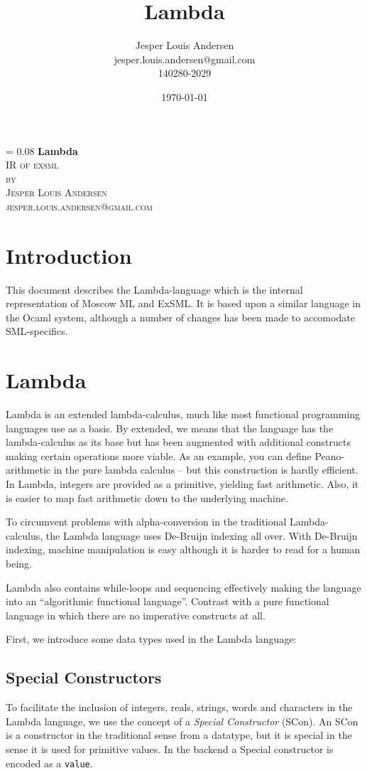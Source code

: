 \documentclass[a4paper, oneside, 10pt, draft]{memoir}
\author{Jesper Louis
  Andersen\\jesper.louis.andersen@gmail.com\\140280-2029}
\title{Lambda}
\date{\today}
\makeatletter
\newlength{\drop}
\newcommand*{\titleM}{\begingroup%
  \drop = 0.08\textheight
  \centering
  {\Huge\bfseries Lambda}\\[\baselineskip]
  {\scshape IR of exsml}\\[\baselineskip]
  {\scshape by}\\[\baselineskip]
  {\large\scshape Jesper Louis Andersen\\jesper.louis.andersen@gmail.com}\par
  \endgroup}
\makeatother
\begin{document}
\newcommand{\janusz}{$\mathrm{JANUS}_0$}
\newcommand{\januso}{$\mathrm{JANUS}_1$}
\newcommand{\lift}[1]{\lfloor #1 \rfloor}
\newcommand{\NN}{\mathbb{N}}
\newcommand{\ZZ}{\mathbb{Z}}
\titleM{}
\begin{abstract}
\end{abstract}
\listoffixmes
\chapter{Introduction}
This document describes the Lambda-language which is the internal
representation of Moscow ML and ExSML. It is based upon a similar
language in the Ocaml system, although a number of changes has been
made to accomodate SML-specifics.

\chapter{Lambda}

Lambda is an extended lambda-calculus, much like most functional
programming languages use as a basis. By extended, we means that the
language has the lambda-calculus as its base but has been augmented
with additional constructs making certain operations more viable. As
an example, you can define Peano-arithmetic in the pure lambda
calculus -- but this construction is hardly efficient. In Lambda,
integers are provided as a primitive, yielding fast arithmetic. Also,
it is easier to map fast arithmetic down to the underlying machine.

To circumvent problems with alpha-conversion in the traditional
Lambda-calculus, the Lambda language uses De-Bruijn indexing all
over. With De-Bruijn indexing, machine manipulation is easy although
it is harder to read for a human being.

Lambda also contains while-loops and sequencing effectively making
the language into an ``algorithmic functional language''. Contrast with
a pure functional language in which there are no imperative constructs
at all.

First, we introduce some data types used in the Lambda language:

\section{Special Constructors}

To facilitate the inclusion of integers, reals, strings, words and
characters in the Lambda language, we use the concept of a
\emph{Special Constructor} (SCon). An SCon is a constructor in the
traditional sense from a datatype, but it is special in the sense it
is used for primitive values. In the backend a Special constructor
is encoded as a \texttt{value}.
\end{document}
